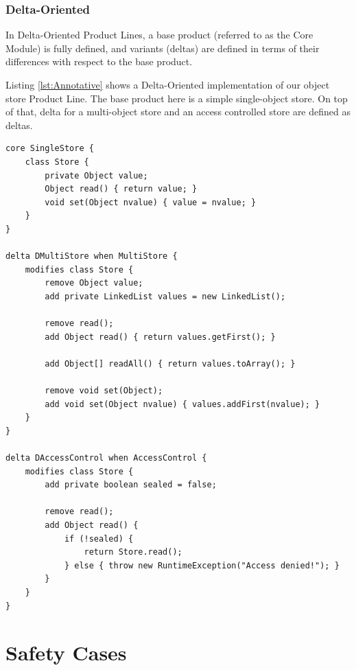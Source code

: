 \documentclass[11pt]{article}
\begin{document}
\subsubsection{Delta-Oriented}

In Delta-Oriented \cite{Schaefer} Product Lines, a base product (referred to as the Core Module) is fully defined, and variants (deltas) are defined in terms of their differences with respect to the base product. 

Listing \ref{lst:Annotative} shows a Delta-Oriented implementation of our object store Product Line. The base product here is a simple single-object store. On top of that, delta for a multi-object store and an access controlled store are defined as deltas. 
 
\begin{lstlisting}[caption=Annotative example, label={lst:Annotative}]
core SingleStore {
	class Store {
		private Object value;
		Object read() { return value; }
		void set(Object nvalue) { value = nvalue; }
	} 
}

delta DMultiStore when MultiStore {
	modifies class Store {
		remove Object value;
		add private LinkedList values = new LinkedList();

		remove read();
		add Object read() { return values.getFirst(); }

		add Object[] readAll() { return values.toArray(); }

		remove void set(Object);
		add void set(Object nvalue) { values.addFirst(nvalue); }
	}
}

delta DAccessControl when AccessControl {
	modifies class Store {
		add private boolean sealed = false;

		remove read();
		add Object read() {
			if (!sealed) {
				return Store.read();
			} else { throw new RuntimeException("Access denied!"); }
		}
	}
}
\end{lstlisting}

\section{Safety Cases}
\end{document}
